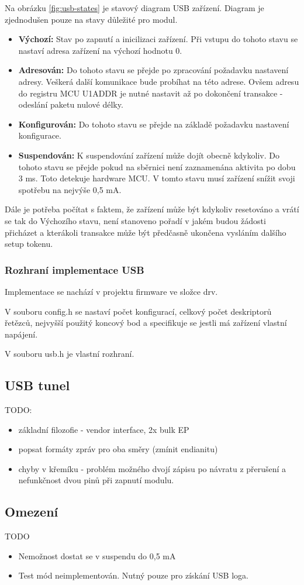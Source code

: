 Na obrázku \ref{fig:usb-states} je stavový diagram USB zařízení. Diagram je zjednodušen pouze na stavy důležité pro modul.
\begin{itemize}
\item \textbf{Výchozí:} Stav po zapnutí a inicilizaci zařízení. Při vstupu do tohoto stavu se nastaví adresa zařízení na výchozí hodnotu 0.
\item \textbf{Adresován:} Do tohoto stavu se přejde po zpracování požadavku nastavení adresy. Veškerá další komunikace bude probíhat na této adrese. Ovšem adresu do registru MCU U1ADDR je nutné nastavit až po dokončení transakce - odeslání paketu nulové délky.
\item \textbf{Konfigurován:} Do tohoto stavu se přejde na základě požadavku nastavení konfigurace. 
\item \textbf{Suspendován:} K suspendování zařízení může dojít obecně kdykoliv. Do tohoto stavu se přejde pokud na sběrnici není zaznamenána aktivita po dobu 3 ms. Toto detekuje hardware MCU. V tomto stavu musí zařízení snížit svoji spotřebu na nejvýše 0,5 mA.
\end{itemize}

Dále je potřeba počítat s faktem, že zařízení může být kdykoliv resetováno a vrátí se tak do Výchozího stavu, není stanoveno pořadí v jakém budou žádosti přicházet a kterákoli transakce může být předčasně ukončena vysláním dalšího setup tokenu. 



\subsubsection{Rozhraní implementace USB}
Implementace se nachází v projektu firmware ve složce drv.


V souboru config.h se nastaví počet konfigurací, celkový počet deskriptorů řetězců, nejvyšší použitý koncový bod a specifikuje se jestli má zařízení vlastní napájení.

V souboru usb.h je vlastní rozhraní.




\subsection{USB \iic tunel}

TODO:
\begin{itemize}
\item základní filozofie - vendor interface, 2x bulk EP
\item popsat formáty zpráv pro oba směry (zmínit endianitu)
\item chyby v křemíku - problém možného dvojí zápisu po návratu z přerušení a nefunkčnost dvou pinů při zapnutí \iic modulu.
\end{itemize}


\subsection{Omezení}

TODO
\begin{itemize}
\item Nemožnost dostat se v suspendu do 0,5 mA
\item Test mód neimplementován. Nutný pouze pro získání USB loga.
\end{itemize}
